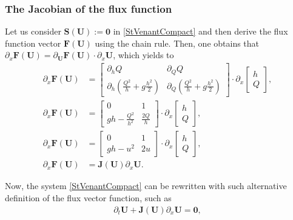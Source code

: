 \documentclass[a4paper]{article}
\numberwithin{equation}{section}
\begin{document}
	\subsubsection{The Jacobian of the flux function}
	Let us consider $\mathbf{S(U)}:=\mathbf{0}$ in \ref{StVenantCompact} and then derive the flux function vector $\mathbf{F(U)}$ using the chain rule. Then, one obtains that $\partial_x\mathbf{F(U)}=\partial_{\mathbf{U}}\mathbf{F(U)}\cdot\partial_x\mathbf{U}$, which yields to
	\begin{align}
		\partial_x\mathbf{F(U)} &= 
		\begin{bmatrix}
			\partial_hQ & \partial_QQ \\
			\partial_h (\frac{Q^2}{h}+g\frac{h^2}{2}) & \partial_Q (\frac{Q^2}{h}+g\frac{h^2}{2}) 
		\end{bmatrix}\cdot
		\partial_x		
		\begin{bmatrix}
			h \\
			Q 
		\end{bmatrix},\\
		\partial_x\mathbf{F(U)} &= 
		\begin{bmatrix}
			0 & 1 \\
			gh-\frac{Q^2}{h^2} & \frac{2Q}{h}
		\end{bmatrix}\cdot
		\partial_x		
		\begin{bmatrix}
			h \\
			Q 
		\end{bmatrix},\\ 
		\partial_x\mathbf{F(U)} &= 
		\begin{bmatrix}
			0 & 1 \\
			gh-u^2 & 2u
		\end{bmatrix}\cdot
		\partial_x		
		\begin{bmatrix}
			h \\
			Q 
		\end{bmatrix},\\ 
		\partial_x\mathbf{F(U)} &= \mathbf{J(U)}\partial_x\mathbf{U}.
	\end{align}

	Now, the system \ref{StVenantCompact} can be rewritten with such alternative definition of the flux vector function, such as
	\begin{align}
		\partial_t \mathbf{U}+\mathbf{J(U)}\partial_x\mathbf{U} = \mathbf{0},
	\end{align}
	
\end{document}
